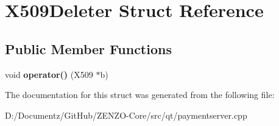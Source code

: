 \hypertarget{struct_x509_deleter}{}\section{X509\+Deleter Struct Reference}
\label{struct_x509_deleter}
\subsection*{Public Member Functions}
\begin{DoxyCompactItemize}
\item 
\mbox{\label{struct_x509_deleter_a496b2630ceb946011713fb36cc2eb0d2}} 
void {\bfseries operator()} (X509 $\ast$b)
\end{DoxyCompactItemize}


The documentation for this struct was generated from the following file\+:\begin{DoxyCompactItemize}
\item 
D\+:/\+Documentz/\+Git\+Hub/\+Z\+E\+N\+Z\+O-\/\+Core/src/qt/paymentserver.\+cpp\end{DoxyCompactItemize}
